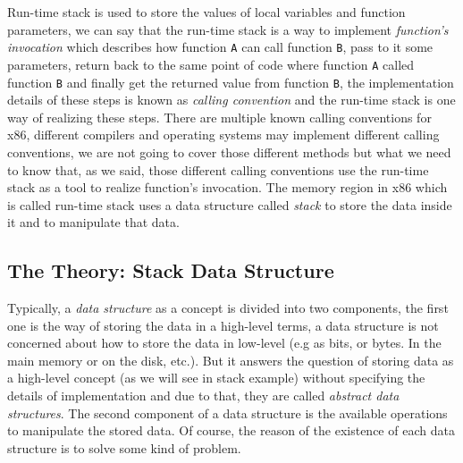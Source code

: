Run-time stack is used to store the values of local variables and
function parameters, we can say that the run-time stack is a way to
implement \emph{function's invocation} which describes how function
\lstinline!A! can call function \lstinline!B!, pass to it some
parameters, return back to the same point of code where function
\lstinline!A! called function \lstinline!B! and finally get the returned
value from function \lstinline!B!, the implementation details of these
steps is known as \emph{calling convention} and the run-time stack is
one way of realizing these steps. There are multiple known calling
conventions for x86, different compilers and operating systems may
implement different calling conventions, we are not going to cover those
different methods but what we need to know that, as we said, those
different calling conventions use the run-time stack as a tool to
realize function's invocation. The memory region in x86 which is called
run-time stack uses a data structure called \emph{stack} to store the
data inside it and to manipulate that data.

\subsection{The Theory: Stack Data
Structure}\label{the-theory-stack-data-structure}

Typically, a \emph{data structure} as a concept is divided into two
components, the first one is the way of storing the data in a high-level
terms, a data structure is not concerned about how to store the data in
low-level (e.g as bits, or bytes. In the main memory or on the disk,
etc.). But it answers the question of storing data as a high-level
concept (as we will see in stack example) without specifying the details
of implementation and due to that, they are called \emph{abstract data
structures}. The second component of a data structure is the available
operations to manipulate the stored data. Of course, the reason of the
existence of each data structure is to solve some kind of problem.

